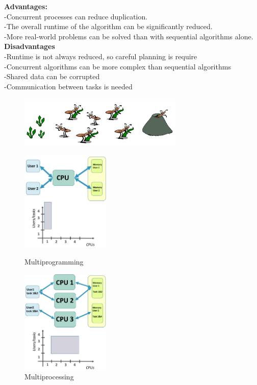 \noindent
\textbf{Advantages:}\\
-Concurrent processes can reduce duplication.\\
-The overall runtime of the algorithm can be significantly reduced.\\
-More real-world problems can be solved than with sequential algorithms alone.\\

\noindent
\textbf{Disadvantages}\\
-Runtime is not always reduced, so careful planning is require\\
-Concurrent algorithms can be more complex than sequential algorithms\\
-Shared data can be corrupted\\
-Communication between tasks is needed\\


\begin{figure}[ht]
    \centering
    \includegraphics[width=0.7\textwidth]{figure_parallel/ant_concurrent.png}\end{figure}
\FloatBarrier

\newpage

\begin{figure}
  \begin{center}
    \includegraphics[width=0.38\textwidth]{figure_parallel/multiprogramming.png}
  \end{center}
  \caption{Multiprogramming \label{multiprog}}
\begin{center}
    \includegraphics[width=0.38\textwidth]{figure_parallel/multiprocessing.png}
  \end{center}
  \caption{Multiprocessing \label{multiproc}}
\end{figure}

